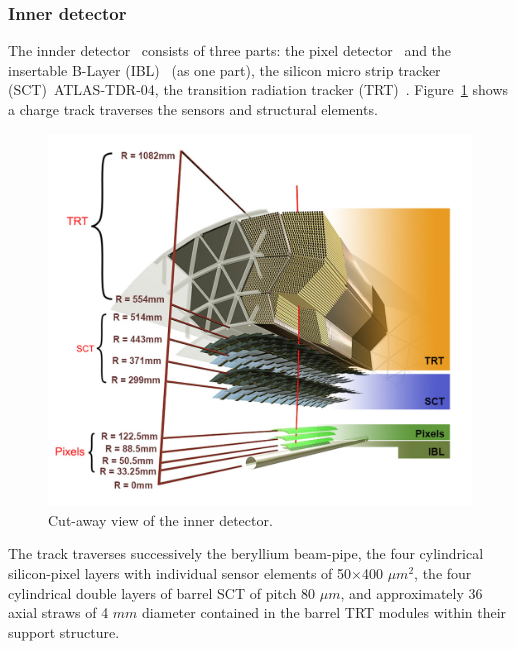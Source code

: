 \subsubsection{Inner detector}	
	The innder detector~\cite{ATLAS-TDR-04} consists of three parts: the pixel detector~\cite{ATLAS-TDR-11}
	and	the insertable B-Layer (IBL)~\cite{ATLAS-TDR-19} (as one part),
	the silicon micro strip tracker (SCT)~\cite{}{ATLAS-TDR-04}, the transition radiation
	tracker (TRT)~\cite{ATLAS-TDR-04}. 
	Figure~\ref{fig:inner_detector} shows a 
	charge track traverses the sensors and structural
	elements. 
	\begin{figure}[bht]
		\begin{centering}	
		\includegraphics[width=.55\textwidth]{Detector_plots/Inner detector.png}
		\caption{Cut-away view of the inner detector.}
		\label{fig:inner_detector}
	\end{centering}
	\end{figure}
	The track traverses successively the beryllium
	beam-pipe, the four cylindrical silicon-pixel layers 
	with individual 
	sensor elements of 50$\times$400 $\mu m^2$, the four cylindrical double 
	layers of barrel SCT of pitch 80 $\mu m$, 
	and approximately 36 axial straws of 4 $mm$ diameter 
	contained in the barrel TRT
	modules within their support structure.
